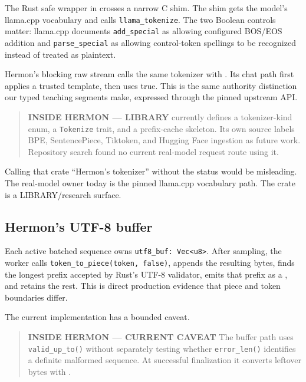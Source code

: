 The Rust safe wrapper in
\texttt{} crosses a narrow C
shim. The shim gets the model's llama.cpp vocabulary and calls
\texttt{llama\_tokenize}. The two Boolean controls matter: llama.cpp
documents \texttt{add\_special} as allowing configured BOS/EOS addition
and \texttt{parse\_special} as allowing control-token spellings to be
recognized instead of treated as plaintext.

Hermon's blocking raw stream calls the same tokenizer with
\texttt{}. Its chat path first applies a
trusted template, then uses true. This is the same authority distinction
our typed teaching segments make, expressed through the pinned upstream
API.

\begin{quote}
\textbf{INSIDE HERMON --- LIBRARY}
\texttt{} currently defines a
tokenizer-kind enum, a \texttt{Tokenize} trait, and a prefix-cache
skeleton. Its own source labels BPE, SentencePiece, Tiktoken, and
Hugging Face ingestion as future work. Repository search found no
current real-model request route using it.
\end{quote}

Calling that crate ``Hermon's tokenizer'' without the status would be
misleading. The real-model owner today is the pinned llama.cpp
vocabulary path. The crate is a LIBRARY/research surface.

\subsection{Hermon's UTF-8 buffer}\label{hermons-utf-8-buffer}

Each active batched sequence owns
\texttt{utf8\_buf:\ Vec\textless{}u8\textgreater{}}. After sampling, the
worker calls \texttt{token\_to\_piece(token,\ false)}, appends the
resulting bytes, finds the longest prefix accepted by Rust's UTF-8
validator, emits that prefix as a
\texttt{}, and retains the rest.
This is direct production evidence that piece and token boundaries
differ.

The current implementation has a bounded caveat.

\begin{quote}
\textbf{INSIDE HERMON --- CURRENT CAVEAT} The buffer path uses
\texttt{valid\_up\_to()} without separately testing whether
\texttt{error\_len()} identifies a definite malformed sequence. At
successful finalization it converts leftover bytes with
\texttt{}.
\end{quote}

